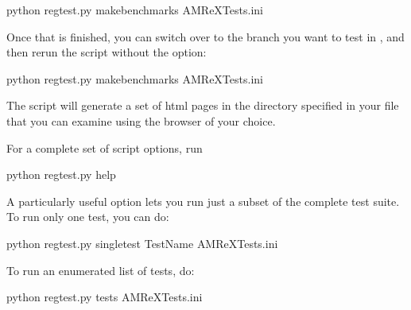 \documentclass[letterpaper,10pt,english]{sphinxmanual}
\begin{document}
\begin{sphinxVerbatim}[commandchars=\\\{\}]
python regtest.py \PYGZhy{}\PYGZhy{}make\PYGZus{}benchmarks  AMReX\PYGZhy{}Tests.ini
\end{sphinxVerbatim}

\sphinxAtStartPar
Once that is finished, you can switch over to the branch you want to test in , and then
re\sphinxhyphen{}run the script without the  option:

\begin{sphinxVerbatim}[commandchars=\\\{\}]
python regtest.py \PYGZhy{}\PYGZhy{}make\PYGZus{}benchmarks  AMReX\PYGZhy{}Tests.ini
\end{sphinxVerbatim}

\sphinxAtStartPar
The script will generate a set of html pages in the directory specified in your 
file that you can examine using the browser of your choice.

\sphinxAtStartPar
For a complete set of script options, run

\begin{sphinxVerbatim}[commandchars=\\\{\}]
python regtest.py \PYGZhy{}\PYGZhy{}help
\end{sphinxVerbatim}

\sphinxAtStartPar
A particularly useful option lets you run just a subset of the complete test suite. To run only one test, you can do:

\begin{sphinxVerbatim}[commandchars=\\\{\}]
python regtest.py \PYGZhy{}\PYGZhy{}single\PYGZus{}test \PYGZlt{}TestName\PYGZgt{} AMReX\PYGZhy{}Tests.ini
\end{sphinxVerbatim}

\sphinxAtStartPar
To run an enumerated list of tests, do:

\begin{sphinxVerbatim}[commandchars=\\\{\}]
python regtest.py \PYGZhy{}\PYGZhy{}tests  AMReX\PYGZhy{}Tests.ini
\end{sphinxVerbatim}
\end{document}
